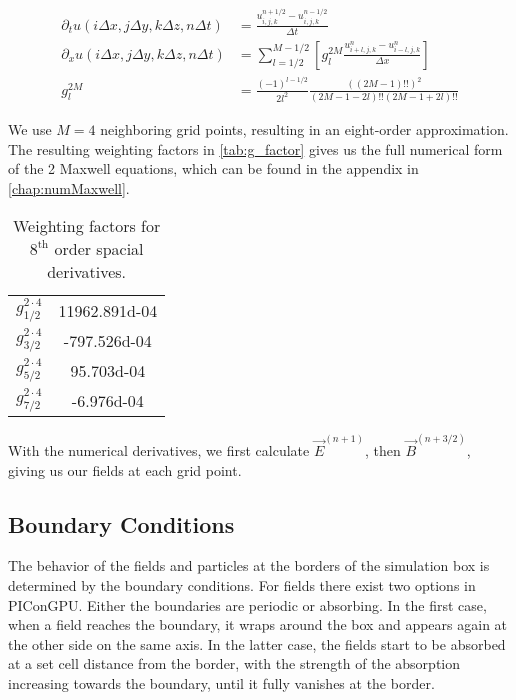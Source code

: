 \documentclass[bachelor_thesis]{subfiles}
\begin{document}
\begin{align}
\partial_t u(i\Delta x,j\Delta y,k\Delta z,n\Delta t) &= \frac{u_{i,j,k}^{n+1/2} - u_{i,j,k}^{n-1/2}}{\Delta t}								\label{equ:derTime}	\\
\partial_x u(i\Delta x,j\Delta y,k\Delta z,n\Delta t) &=  \sum\limits_{l=1/2}^{M-1/2} \left[ g^{2M}_l \frac{u_{i + l, j, k}^n - u_{i - l, j, k}^n}{\Delta x} \right] 	\label{equ:derSpace}	\\
g^{2M}_l &= \frac{(-1)^{l-1/2}}{2l^2} \frac{((2M-1)!!)^2}{(2M -1 - 2l)!! (2M -1 + 2l)!!}											\label{equ:g_factor}
\end{align}

We use $M=4$ neighboring grid points, resulting in an eight-order approximation. The resulting weighting factors in \autoref{tab:g_factor} gives us the full numerical form of the 2 Maxwell equations, which can be found in the appendix in \autoref{chap:numMaxwell}.
\begin{table}
\begin{center}
\begin{tabular}{ |c|c| }
	\hline
	$g_{1/2}^{2\cdot 4}$ & \num{11962.891d-04} \\ 
	$g_{3/2}^{2\cdot 4}$ & \num{-797.526d-04} \\  
	$g_{5/2}^{2\cdot 4}$ & \num{95.703d-04} \\	
	$g_{7/2}^{2\cdot 4}$ & \num{-6.976d-04} \\
	 \hline
\end{tabular}
\caption{Weighting factors for $\mathrm{8^{th}}$ order spacial derivatives.}\label{tab:g_factor}
\end{center}
\end{table}


With the numerical derivatives, we first calculate $\vec{E}^{(n+1)}$, then $\vec{B}^{(n+3/2)}$, giving us our fields at each grid point.

\subsection{Boundary Conditions}
The behavior of the fields and particles at the borders of the simulation box is determined by the boundary conditions.
For fields there exist two options in PIConGPU. Either the boundaries are periodic or absorbing. In the first case, when a field reaches the boundary, it wraps around the box and appears again at the other side on the same axis.
In the latter case, the fields start to be absorbed at a set cell distance from the border, with the strength of the absorption increasing towards the boundary, until it fully vanishes at the border.
\end{document}

